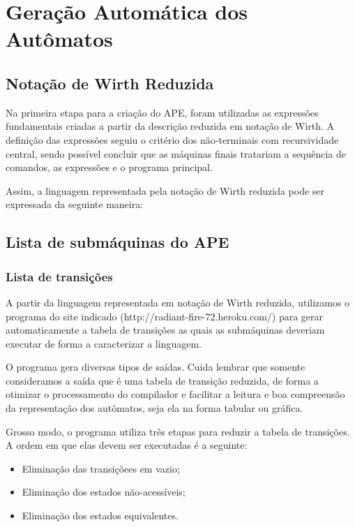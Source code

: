 \documentclass[12pt,oneside,a4paper,english]{abntex2}
\begin{document}
\chapter{Geração Automática dos Autômatos}
  \section{Notação de Wirth Reduzida}

    Na primeira etapa para a criação do APE, foram utilizadas as expressões fundamentais criadas a partir da descrição reduzida em notação de Wirth. A definição das expressões seguiu o critério dos não-terminais com recursividade central, sendo possível concluir que as máquinas finais tratariam a sequência de comandos, as expressões e o programa principal.


    Assim, a linguagem representada pela notação de Wirth reduzida pode ser expressada da seguinte maneira:
    

    

  \section{Lista de submáquinas do APE}
    \subsection{Lista de transições}

      A partir da linguagem representada em notação de Wirth reduzida, utilizamos o programa do site indicado (http://radiant-fire-72.heroku.com/) para gerar automaticamente a tabela de transições as quais as submáquinas deveriam executar de forma a caracterizar a linguagem.

      O programa gera diversas tipos de saídas. Cuida lembrar que somente consideramos a saída que é uma tabela de transição reduzida, de forma a otimizar o processamento do compilador e facilitar a leitura e boa compreensão da representação dos autômatos, seja ela na forma tabular ou gráfica.


      Grosso modo, o programa utiliza três etapas para reduzir a tabela de transições. A ordem em que elas devem ser executadas é a seguinte:


      \begin{itemize}
        \item Eliminação das transiçõees em vazio;
        \item Eliminação dos estados não-acessíveis;
        \item Eliminação dos estados equivalentes.
      \end{itemize}
\end{document}
